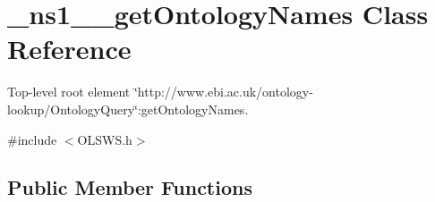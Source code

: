 \hypertarget{class__ns1____getOntologyNames}{
\section{\_\-ns1\_\-\_\-getOntologyNames Class Reference}
\label{class__ns1____getOntologyNames}
}


Top-\/level root element \char`\"{}http://www.ebi.ac.uk/ontology-\/lookup/OntologyQuery\char`\"{}:getOntologyNames.  




{\ttfamily \#include $<$OLSWS.h$>$}

\subsection*{Public Member Functions}
